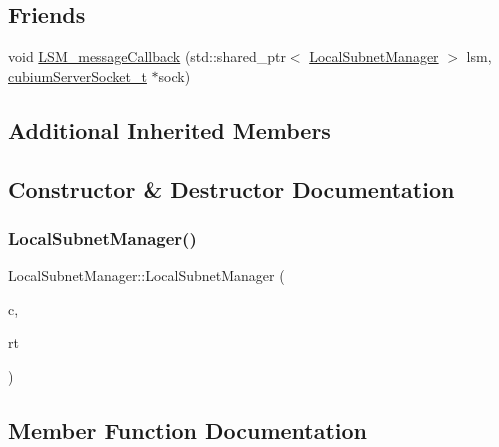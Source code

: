 \subsection*{Friends}
\begin{DoxyCompactItemize}
\item 
void \hyperlink{classLocalSubnetManager_a15ed1b4951854aeb9f6bdd54816a16be}{L\+S\+M\+\_\+message\+Callback} (std\+::shared\+\_\+ptr$<$ \hyperlink{classLocalSubnetManager}{Local\+Subnet\+Manager} $>$ lsm, \hyperlink{structcubiumServerSocket__t}{cubium\+Server\+Socket\+\_\+t} $\ast$sock)
\end{DoxyCompactItemize}
\subsection*{Additional Inherited Members}


\subsection{Constructor \& Destructor Documentation}
\mbox{\label{classLocalSubnetManager_ae77d1c9d08c317f43e7a36d1ae8671f3}} 
\subsubsection{\texorpdfstring{Local\+Subnet\+Manager()}{LocalSubnetManager()}}
{\footnotesize\ttfamily Local\+Subnet\+Manager\+::\+Local\+Subnet\+Manager (\begin{DoxyParamCaption}\item[{std\+::shared\+\_\+ptr$<$ \hyperlink{classSpaCommunicator}{Spa\+Communicator} $>$}]{c,  }\item[{std\+::shared\+\_\+ptr$<$ \hyperlink{classRoutingTable}{Routing\+Table}$<$ \hyperlink{structcubiumServerSocket__t}{cubium\+Server\+Socket\+\_\+t} $>$$>$}]{rt }\end{DoxyParamCaption})\hspace{0.3cm}{\ttfamily [inline]}}



\subsection{Member Function Documentation}
\mbox{\label{classLocalSubnetManager_a8cd2838196edcd75a77f532bce15c2fd}} 
